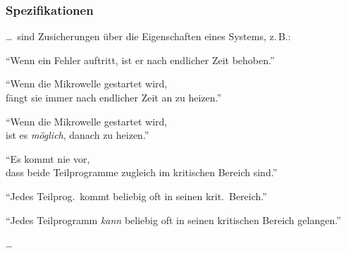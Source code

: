     \begin{frame}
      \frametitle{Spezifikationen}

      \dots\ sind Zusicherungen über die Eigenschaften eines Systems, z.\,B.:
      \par\smallskip
      \begin{Itemize}
        \item
          "`Wenn ein Fehler auftritt, ist er nach endlicher Zeit behoben."'
        \item
          "`Wenn die Mikrowelle gestartet wird, \\
          fängt sie immer nach endlicher Zeit an zu heizen."'
        \item
          "`Wenn die Mikrowelle gestartet wird, \\
          ist es \emph{möglich}, danach zu heizen."'
          \par\bigskip
        \item<2->
          "`Es kommt nie vor,\\
          dass beide Teilprogramme zugleich im kritischen Bereich sind."'
        \item<2->
          "`Jedes Teilprog.\ kommt beliebig oft in seinen krit.\ Bereich."'
        \item<2->
          "`Jedes Teilprogramm \emph{kann} beliebig oft in seinen kritischen Bereich gelangen."'
          \par\bigskip
        \item<3->
          \dots
      \end{Itemize}

    \end{frame}

